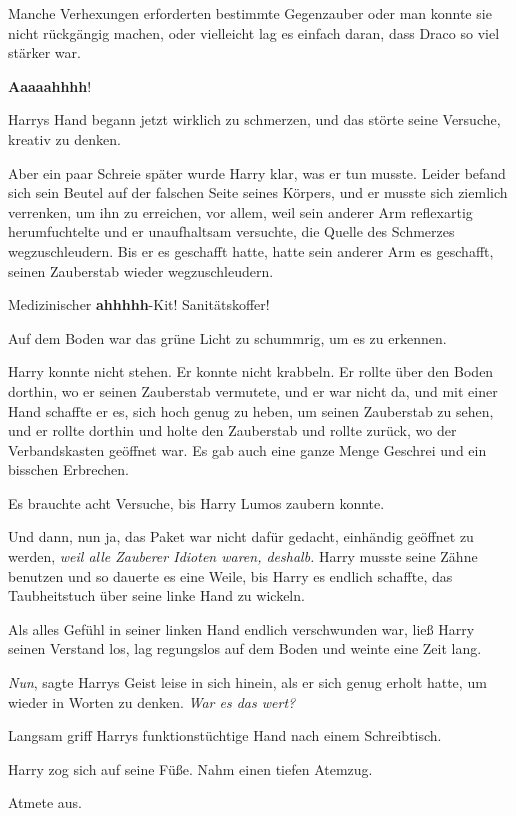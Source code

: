 Manche Verhexungen erforderten bestimmte Gegenzauber oder man konnte sie nicht
rückgängig machen, oder vielleicht lag es einfach daran, dass Draco so viel
stärker war.

\glqq{}\textbf{Aaaaahhhh}!\grqq{}

Harrys Hand begann jetzt wirklich zu schmerzen, und das störte seine Versuche,
kreativ zu denken.

Aber ein paar Schreie später wurde Harry klar, was er tun musste. Leider befand
sich sein Beutel auf der falschen Seite seines Körpers, und er musste sich
ziemlich verrenken, um ihn zu erreichen, vor allem, weil sein anderer Arm
reflexartig herumfuchtelte und er unaufhaltsam versuchte, die Quelle des
Schmerzes wegzuschleudern. Bis er es geschafft hatte, hatte sein anderer Arm es
geschafft, seinen Zauberstab wieder wegzuschleudern.

\glqq{}Medizinischer \textbf{ahhhhh}-Kit! Sanitätskoffer!\grqq{}

Auf dem Boden war das grüne Licht zu schummrig, um es zu erkennen.

Harry konnte nicht stehen. Er konnte nicht krabbeln. Er rollte über den Boden
dorthin, wo er seinen Zauberstab vermutete, und er war nicht da, und mit einer
Hand schaffte er es, sich hoch genug zu heben, um seinen Zauberstab zu sehen,
und er rollte dorthin und holte den Zauberstab und rollte zurück, wo der
Verbandskasten geöffnet war. Es gab auch eine ganze Menge Geschrei und ein
bisschen Erbrechen.

Es brauchte acht Versuche, bis Harry Lumos zaubern konnte.

Und dann, nun ja, das Paket war nicht dafür gedacht, einhändig geöffnet zu
werden, \emph{weil alle Zauberer Idioten waren, deshalb.} Harry musste seine
Zähne benutzen und so dauerte es eine Weile, bis Harry es endlich schaffte, das
Taubheitstuch über seine linke Hand zu wickeln.

Als alles Gefühl in seiner linken Hand endlich verschwunden war, ließ Harry
seinen Verstand los, lag regungslos auf dem Boden und weinte eine Zeit lang.

\emph{Nun}, sagte Harrys Geist leise in sich hinein, als er sich genug erholt
hatte, um wieder in Worten zu denken.\emph{ War es das wert?}

Langsam griff Harrys funktionstüchtige Hand nach einem Schreibtisch.

Harry zog sich auf seine Füße. Nahm einen tiefen Atemzug.

Atmete aus.

